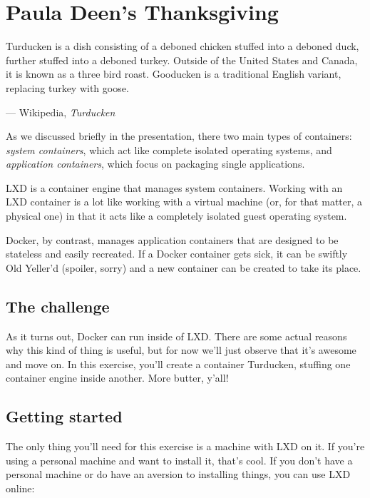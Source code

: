 \chapter*{Paula Deen's Thanksgiving}

\begin{quoting}
  Turducken is a dish consisting of a deboned chicken stuffed into a deboned duck, further stuffed into a deboned turkey. Outside of the United States and Canada, it is known as a three bird roast. Gooducken is a traditional English variant, replacing turkey with goose.

  \begin{flushright}
    --- Wikipedia, \textit{Turducken}
  \end{flushright}
\end{quoting}

\vspace{2em}

As we discussed briefly in the presentation, there two main types of containers: \textit{system containers}, which act like complete isolated operating systems, and \textit{application containers}, which focus on packaging single applications.

LXD is a container engine that manages system containers. Working with an LXD container is a lot like working with a virtual machine (or, for that matter, a physical one) in that it acts like a completely isolated guest operating system.

Docker, by contrast, manages application containers that are designed to be stateless and easily recreated. If a Docker container gets sick, it can be swiftly Old Yeller'd (spoiler, sorry) and a new container can be created to take its place.

\section*{The challenge}

As it turns out, Docker can run inside of LXD. There are some actual reasons why this kind of thing is useful, but for now we'll just observe that it's awesome and move on. In this exercise, you'll create a container Turducken, stuffing one container engine inside another. More butter, y'all!

\section*{Getting started}

The only thing you'll need for this exercise is a machine with LXD on it. If you're using a personal machine and want to install it, that's cool. If you don't have a personal machine or do have an aversion to installing things, you can use LXD online:

